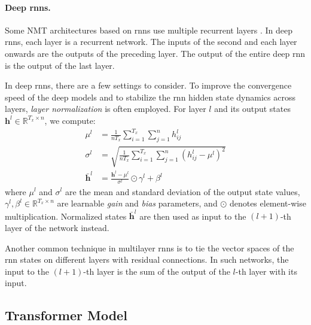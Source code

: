 \paragraph{Deep \acp{rnn}.} Some NMT architectures based on \acp{rnn} use
multiple recurrent layers \citep{miceli-barone-etal-2017-deep,wu2016google}. In
deep \acp{rnn}, each layer is a recurrent network. The inputs of the second and
each layer onwards are the outputs of the preceding layer. The output of the
entire deep \ac{rnn} is the output of the last layer.

In deep \acp{rnn}, there are a few settings to consider.
%
To improve the convergence speed of the deep models and to stabilize the
\ac{rnn} hidden state dynamics across layers, \emph{layer normalization}
\citep{ba2016layer} is often employed. For layer $l$ and its output states
$\mathbf{h}^l \in \mathbb{R}^{T_x \times n}$, we compute:
%
\begin{align}
  \mu^l &= \frac{1}{nT_x} \sum_{i=1}^{T_x}\sum_{j=1}^n h^l_{ij} \\
  \sigma^l &= \sqrt{\frac{1}{nT_x} \sum_{i=1}^{T_x}\sum_{j=1}^n (h^l_{ij} - \mu^l)^2} \\
  \bar{\mathbf{h}}^l &= \frac{\mathbf{h}^l - \mu^l}{\sigma^l} \odot \gamma^l + \beta^l
\end{align}
%
where $\mu^l$ and $\sigma^l$ are the mean and standard deviation of the output
state values, $\gamma^l, \beta^l \in \mathbb{R}^{T_x \times n}$ are learnable
\emph{gain} and \emph{bias} parameters, and $\odot$ denotes element-wise
multiplication. Normalized states $\bar{\mathbf{h}}^l$ are then used as input
to the $(l+1)$-th layer of the network instead.

Another common technique in multilayer \acp{rnn} is to tie the vector spaces of
the \ac{rnn} states on different layers with residual connections. In such
networks, the input to the $(l+1)$-th layer is the sum of the output of the
$l$-th layer with its input.


\subsection{Transformer Model}
\label{sec:encdec:transformer}

